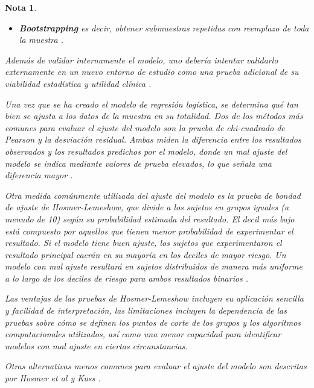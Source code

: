 \documentclass[12pt]{article}
\newtheorem{Note}{Nota}%
\begin{document}
\begin{Note}
\begin{itemize}
\item[d) ] \textbf{Bootstrapping} es decir, obtener submuestras repetidas con reemplazo de toda la muestra \cite{kohavi1995,efron1993}.
\end{itemize}

Adem\'as de validar internamente el modelo, uno deber\'ia intentar validarlo externamente en un nuevo entorno de estudio como una prueba adicional de su viabilidad estad\'istica y utilidad cl\'inica \cite{altman2000,miller1991}.

Una vez que se ha creado el modelo de regresi\'on log\'istica, se determina qu\'e tan bien se ajusta a los datos de la muestra en su totalidad. Dos de los m\'etodos m\'as comunes para evaluar el ajuste del modelo son la prueba de chi-cuadrado de Pearson y la desviaci\'on residual. Ambas miden la diferencia entre los resultados observados y los resultados predichos por el modelo, donde un mal ajuste del modelo se indica mediante valores de prueba elevados, lo que se\~nala una diferencia mayor \cite{hosmer2000, hosmer1997, kuss2002}. \medskip

Otra medida com\'unmente utilizada del ajuste del modelo es la prueba de bondad de ajuste de \textit{Hosmer-Lemeshow}, que divide a los sujetos en grupos iguales (a menudo de 10) seg\'un su probabilidad estimada del resultado. El decil m\'as bajo est\'a compuesto por aquellos que tienen menor probabilidad de experimentar el resultado. Si el modelo tiene buen ajuste, los sujetos que experimentaron el resultado principal caer\'an en su mayor\'ia en los deciles de mayor riesgo. Un modelo con mal ajuste resultar\'a en sujetos distribuidos de manera m\'as uniforme a lo largo de los deciles de riesgo para ambos resultados binarios \cite{tabachnick2007, hosmer2000}.\medskip

Las ventajas de las pruebas de Hosmer-Lemeshow incluyen su aplicaci\'on sencilla y facilidad de interpretaci\'on, las limitaciones incluyen la dependencia de las pruebas sobre c\'omo se definen los puntos de corte de los grupos y los algoritmos computacionales utilizados, as\'i como una menor capacidad para identificar modelos con mal ajuste en ciertas circunstancias.  \medskip

Otras alternativas menos comunes para evaluar el ajuste del modelo son descritas por Hosmer et al \cite{hosmer1997} y Kuss \cite{kuss2002}.

\end{Note}


\newpage
\end{document}
